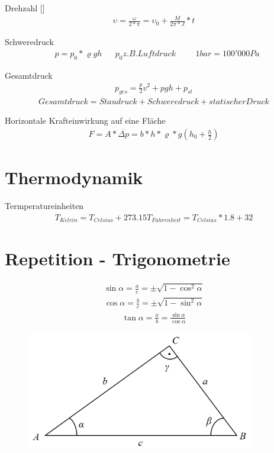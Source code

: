 \documentclass[17pt]{extarticle}
\begin{document}
	Drehzahl []
	\begin{align}
		\upsilon = \frac{\omega}{2 * \pi} = \upsilon_{0} + \frac{M}{2\pi * J} * t 
	\end{align}
	
	Schweredruck 
	\begin{align}
		&p = p_0 * \varrho g h
		&&p_0 z.B. Luftdruck 
		&&&1 bar = 100'000 Pa
	\end{align}
	
	Gesamtdruck
	\begin{align}
		p_{ges} = \frac{p}{2}v^2 + pgh + p_{st}
	\end{align}
	\begin{align}		
		Gesamtdruck = Staudruck + Schweredruck + statischer Druck
	\end{align}

	Horizontale Krafteinwirkung auf eine Fläche
	\begin{align}
		F = A * \overline{\Delta p} = b*h * \varrho*g (h_{0} + \frac{h}{2})
	\end{align}
	
	
\section{Thermodynamik}
	Termperatureinheiten
	\begin{align}
		T_{Kelvin} = T_{Celsius} + 273.15
		T_{Fahrenheit} = T_{Celsius} * 1.8 + 32
	\end{align}
\section{Repetition - Trigonometrie}
	\begin{align}
		\sin \alpha = \frac{a}{c} = \pm \sqrt{1 - \cos^2 \alpha}
	\end{align}
	\begin{align}
		\cos \alpha = \frac{b}{c} = \pm \sqrt{1 - \sin^2 \alpha}
	\end{align}
	\begin{align}
		\tan \alpha = \frac{a}{b} = \frac{\sin \alpha}{\cos \alpha}
	\end{align}
	\begin{figure}[h!]
		\centering
		\includegraphics[width=10cm]{img/Trigonometrie.png}
	\end{figure}
	
\end{document}
